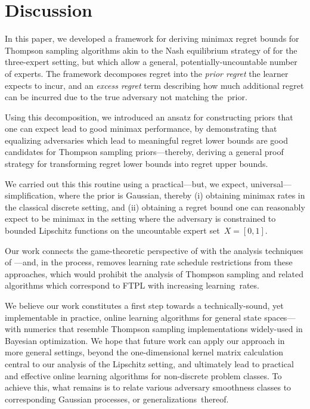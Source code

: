 \documentclass[preprint,12pt]{colt2025}
\begin{document}
\section{Discussion} 

In this paper, we developed a framework for deriving minimax regret bounds for Thompson sampling algorithms akin to the Nash equilibrium strategy of \textcite{gravin2016towards} for the three-expert setting, but which allow a general, potentially-uncountable number of experts.
The framework decomposes regret into the \emph{prior regret} the learner expects to incur, and an \emph{excess regret} term describing how much additional regret can be incurred due to the true adversary not matching the~prior.

Using this decomposition, we introduced an ansatz for constructing priors that one can expect lead to good minimax performance, by demonstrating that equalizing adversaries which lead to meaningful regret lower bounds are good candidates for Thompson sampling priors---thereby, deriving a general proof strategy for transforming regret lower bounds into regret upper bounds.

We carried out this this routine using a practical---but, we expect, universal---simplification, where the prior is Gaussian, thereby (i) obtaining minimax rates in the classical discrete setting, and (ii) obtaining a regret bound one can reasonably expect to be minimax in the setting where the adversary is constrained to bounded Lipschitz functions on the uncountable expert set~$X = [0,1]$.

Our work connects the game-theoretic perspective of \textcite{gravin2016towards} with the analysis techniques of \textcite{abernethy14,abernethy2016perturbation,orabona2019modern}---and, in the process, removes learning rate schedule restrictions from these approaches, which would prohibit the analysis of Thompson sampling and related algorithms which correspond to FTPL with increasing learning~rates.

We believe our work constitutes a first step towards a technically-sound, yet implementable in practice, online learning algorithms for general state spaces---with numerics that resemble Thompson sampling implementations widely-used in Bayesian optimization.
We hope that future work can apply our approach in more general settings, beyond the one-dimensional kernel matrix calculation central to our analysis of the Lipschitz setting, and ultimately lead to practical and effective online learning algorithms for non-discrete problem classes.
To achieve this, what remains is to relate various adversary smoothness classes to corresponding Gaussian processes, or generalizations~thereof.
\end{document}
